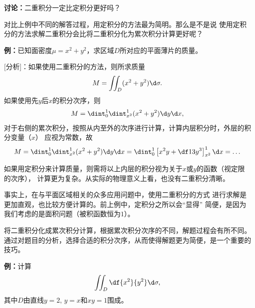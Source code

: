 \begin{shaded}

{\bf 讨论：}二重积分一定比定积分更好吗？

对比上例中不同的解答过程，用定积分的方法最为简明。那么是不是说
使用定积分的方法求解二重积分会比将二重积分化为累次积分计算更好呢？

{\bf 例：}已知面密度$\mu=x^2+y^2$，求区域$D$所对应的平面薄片的质量。

[分析]：如果使用二重积分的方法，则所求质量
$$M=\iint_D(x^2+y^2)\d\sigma.$$
如果使用先$y$后$x$的积分次序，则
$$M=\dint_0^1\dint_{x^2}^1(x^2+y^2)\d y\d x,$$
对于右侧的累次积分，按照从内至外的次序进行计算，计算内层积分时，外层的积分变量（$x$）
应视为常数，故
$$M=\dint_0^1\dint_{x^2}^1(x^2+y^2)\d y\d x
=\dint_0^1\left[x^2y+\df13y^3\right]_{x^2}^1\d x=\ldots$$

如果用定积分来计算质量，则需将以上内层的积分视为关于$x$或$y$的函数（视定限的次序），
计算更为复杂。从实际的物理意义上看，也没有二重积分清晰。

事实上，在与平面区域相关的众多应用问题中，使用二重积分的方式
进行求解是更加直观，也比较方便计算的。前上例中，定积分之所以会“显得”
简便，是因为我们考虑的是面积问题（被积函数恒为$1$）。

\end{shaded}
% 

% 

将二重积分化成累次积分计算，根据累次积分次序的不同，解题过程会有所不同。
通过对题目的分析，选择合适的积分次序，从而使得解题更为简便，是一个重要的技巧。

{\bf 例：}计算
$$\iint_D\df{x^2}{y^2}\d\sigma,$$
其中$D$由直线$y=2,\,y=x$和$xy=1$围成。

